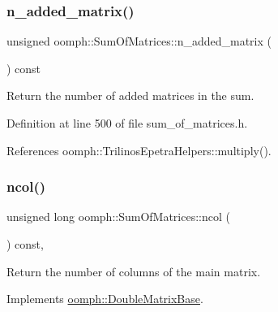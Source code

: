 \mbox{\label{classoomph_1_1SumOfMatrices_a4b75af475c7e1d9d7e5a66065895abe7}} 
\subsubsection{\texorpdfstring{n\+\_\+added\+\_\+matrix()}{n\_added\_matrix()}}
{\footnotesize\ttfamily unsigned oomph\+::\+Sum\+Of\+Matrices\+::n\+\_\+added\+\_\+matrix (\begin{DoxyParamCaption}{ }\end{DoxyParamCaption}) const\hspace{0.3cm}{\ttfamily [inline]}}



Return the number of added matrices in the sum. 



Definition at line 500 of file sum\+\_\+of\+\_\+matrices.\+h.



References oomph\+::\+Trilinos\+Epetra\+Helpers\+::multiply().

\mbox{\label{classoomph_1_1SumOfMatrices_ad18b4591850b5e89ee6695407aaeec54}} 
\subsubsection{\texorpdfstring{ncol()}{ncol()}}
{\footnotesize\ttfamily unsigned long oomph\+::\+Sum\+Of\+Matrices\+::ncol (\begin{DoxyParamCaption}{ }\end{DoxyParamCaption}) const\hspace{0.3cm}{\ttfamily [inline]}, {\ttfamily [virtual]}}



Return the number of columns of the main matrix. 



Implements \hyperlink{classoomph_1_1DoubleMatrixBase_a253feffbf1db1976cdd86c6134c50abe}{oomph\+::\+Double\+Matrix\+Base}.




